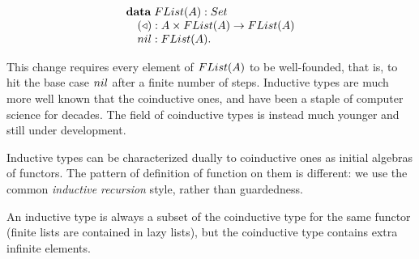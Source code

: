 $$
\begin{array}[t]{l}
\data\;
\flst{A}:\set\\
\quad (\scons): A\times \flst{A}\rightarrow\flst{A}\\
\quad \nil: \flst{A}.
\end{array}
$$

This change requires every element of $\flst{A}$ to be well-founded, that is, to hit the base case $\nil$ after a finite number of steps.
Inductive types are much more well known that the coinductive ones, and have been a staple of computer science for decades.
The field of coinductive types is instead much younger and still under development.

Inductive types can be characterized dually to coinductive ones as initial algebras of functors.
The pattern of definition of function on them is different: we use the common {\em inductive recursion} style, rather than guardedness.

An inductive type is always a subset of the coinductive type for the same functor (finite lists are contained in lazy lists), but the coinductive type contains extra infinite elements.

